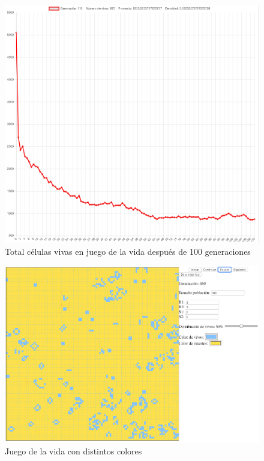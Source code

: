 	\begin{figure}[H]
		\begin{center}
			\includegraphics[scale=.24]{GOL/img/life2.png}
			\caption{Total células vivas en juego de la vida después de 100 generaciones}
			\label{fig:gol5}
		\end{center}
	\end{figure}

	\begin{figure}[H]
		\begin{center}
			\includegraphics[scale=.3]{GOL/img/lifecolores.png}
			\caption{Juego de la vida con distintos colores}
			\label{fig:gol5}
		\end{center}
	\end{figure}

